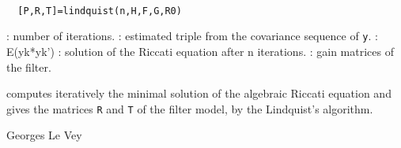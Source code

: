 
\begin{mandesc}
   \\ %
\end{mandesc}
\begin{calling_sequence}
\begin{verbatim}
  [P,R,T]=lindquist(n,H,F,G,R0)  
\end{verbatim}
\end{calling_sequence}
\begin{parameters}
  \begin{varlist}
    : number of iterations.
    : estimated triple from the covariance sequence of \verb!y!.
    : E(yk*yk')
    : solution of the Riccati equation after n iterations.
    : gain matrices of the filter.
  \end{varlist}
\end{parameters}
\begin{mandescription}
  computes iteratively the minimal solution of the algebraic
  Riccati equation and gives the matrices \verb!R! and \verb!T! of the 
  filter model, by the Lindquist's algorithm.
\end{mandescription}
\begin{manseealso}
      
\end{manseealso}
\begin{authors}
  Georges Le Vey
\end{authors}
